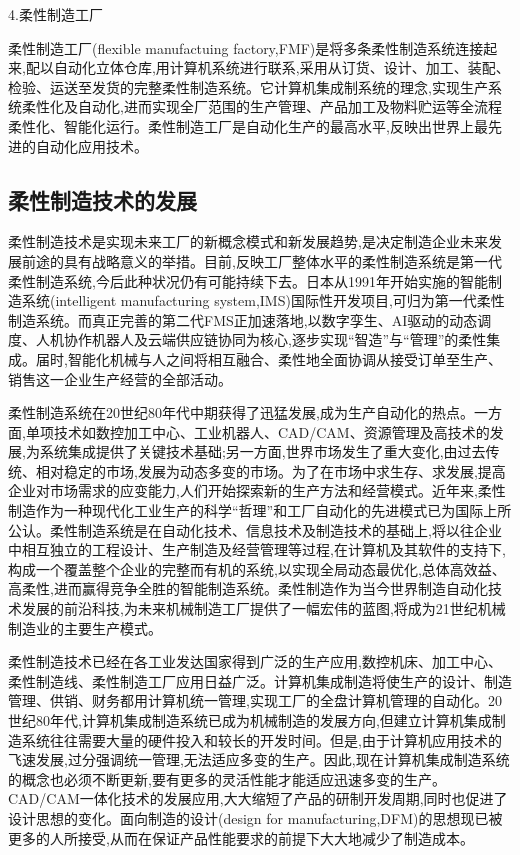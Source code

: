 \documentclass[UTF8]{ctexbook}
\newcommand{\◎}{\ensuremath{\bigcirc}}
\begin{document}
4.柔性制造工厂
    
    柔性制造工厂(flexible manufactuing factory,FMF)是将多条柔性制造系统连接起来,配以自动化立体仓库,用计算机系统进行联系,采用从订货、设计、加工、装配、检验、运送至发货的完整柔性制造系统。它计算机集成制系统的理念,实现生产系统柔性化及自动化,进而实现全厂范围的生产管理、产品加工及物料贮运等全流程柔性化、智能化运行。柔性制造工厂是自动化生产的最高水平,反映出世界上最先进的自动化应用技术。


\subsection{柔性制造技术的发展}
柔性制造技术是实现未来工厂的新概念模式和新发展趋势,是决定制造企业未来发展前途的具有战略意义的举措。目前,反映工厂整体水平的柔性制造系统是第一代柔性制造系统,今后此种状况仍有可能持续下去。日本从1991年开始实施的智能制造系统(intelligent manufacturing system,IMS)国际性开发项目,可归为第一代柔性制造系统。而真正完善的第二代FMS正加速落地,以数字孪生、AI驱动的动态调度、人机协作机器人及云端供应链协同为核心,逐步实现“智造”与“管理”的柔性集成。届时,智能化机械与人之间将相互融合、柔性地全面协调从接受订单至生产、销售这一企业生产经营的全部活动。

柔性制造系统在20世纪80年代中期获得了迅猛发展,成为生产自动化的热点。一方面,单项技术如数控加工中心、工业机器人、CAD/CAM、资源管理及高技术的发展,为系统集成提供了关键技术基础;另一方面,世界市场发生了重大变化,由过去传统、相对稳定的市场,发展为动态多变的市场。为了在市场中求生存、求发展,提高企业对市场需求的应变能力,人们开始探索新的生产方法和经营模式。近年来,柔性制造作为一种现代化工业生产的科学“哲理”和工厂自动化的先进模式已为国际上所公认。柔性制造系统是在自动化技术、信息技术及制造技术的基础上,将以往企业中相互独立的工程设计、生产制造及经营管理等过程,在计算机及其软件的支持下,构成一个覆盖整个企业的完整而有机的系统,以实现全局动态最优化,总体高效益、高柔性,进而赢得竞争全胜的智能制造系统。柔性制造作为当今世界制造自动化技术发展的前沿科技,为未来机械制造工厂提供了一幅宏伟的蓝图,将成为21世纪机械制造业的主要生产模式。

柔性制造技术已经在各工业发达国家得到广泛的生产应用,数控机床、加工中心、柔性制造线、柔性制造工厂应用日益广泛。计算机集成制造将使生产的设计、制造管理、供销、财务都用计算机统一管理,实现工厂的全盘计算机管理的自动化。20世纪80年代,计算机集成制造系统已成为机械制造的发展方向,但建立计算机集成制造系统往往需要大量的硬件投入和较长的开发时间。但是,由于计算机应用技术的飞速发展,过分强调统一管理,无法适应多变的生产。因此,现在计算机集成制造系统的概念也必须不断更新,要有更多的灵活性能才能适应迅速多变的生产。CAD/CAM一体化技术的发展应用,大大缩短了产品的研制开发周期,同时也促进了设计思想的变化。面向制造的设计(design for manufacturing,DFM)的思想现已被更多的人所接受,从而在保证产品性能要求的前提下大大地减少了制造成本。
\end{document}
